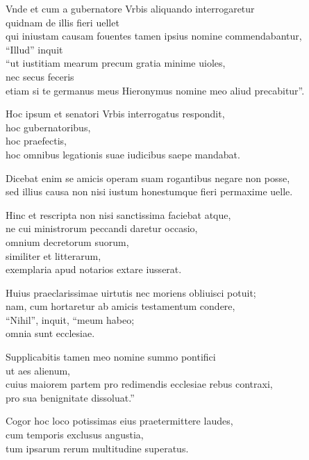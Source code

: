 \documentclass[a5paper,twoside]{article}
\begin{document}
Vnde et cum a gubernatore Vrbis aliquando interrogaretur \\
quidnam de illis fieri uellet \\
qui iniustam causam fouentes tamen ipsius nomine commendabantur, \\
``Illud'' inquit \\
``ut iustitiam mearum precum gratia minime uioles, \\
nec secus feceris \\
etiam si te germanus meus Hieronymus nomine meo aliud precabitur''.  

Hoc ipsum et senatori Vrbis interrogatus respondit, \\
hoc gubernatoribus, \\
hoc praefectis, \\
hoc omnibus legationis suae iudicibus saepe mandabat.  

Dicebat enim se amicis operam suam rogantibus negare non posse, \\
sed illius causa non nisi iustum honestumque fieri permaxime uelle.   

Hinc et rescripta non nisi sanctissima faciebat atque, \\
ne cui ministrorum peccandi daretur occasio, \\
omnium decretorum suorum, \\
similiter et litterarum, \\
exemplaria apud notarios extare iusserat.  

Huius praeclarissimae uirtutis nec moriens obliuisci potuit; \\
nam, cum hortaretur ab amicis testamentum condere, \\
``Nihil'', inquit, ``meum habeo; \\
omnia sunt ecclesiae. 

Supplicabitis tamen meo nomine summo pontifici \\
ut aes alienum, \\
cuius maiorem partem pro redimendis ecclesiae rebus contraxi, \\
pro sua benignitate dissoluat.''

Cogor hoc loco potissimas eius praetermittere laudes, \\
cum temporis exclusus angustia, \\
tum ipsarum rerum multitudine superatus.
\end{document}
